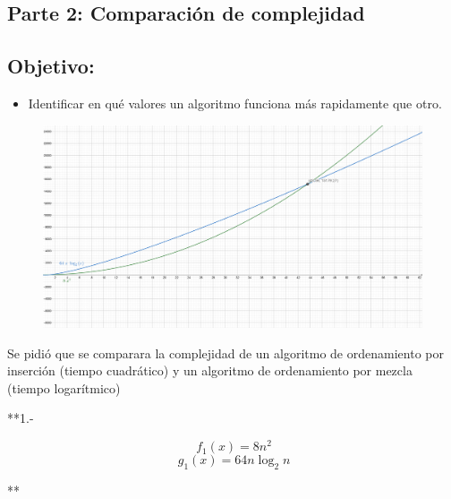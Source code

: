 \documentclass[11pt]{article}
\makeatletter
\def\maxwidth{\ifdim\Gin@nat@width>\linewidth\linewidth
    \else\Gin@nat@width\fi}
\let\Oldincludegraphics\includegraphics
\renewcommand{\includegraphics}[1]{\Oldincludegraphics[width=.8\maxwidth]{#1}}
\providecommand{\tightlist}{%
      \setlength{\itemsep}{0pt}\setlength{\parskip}{0pt}}
\makeatother
\begin{document}
    \subsection{Parte 2: Comparación de
complejidad}\label{parte-2-comparaciuxf3n-de-complejidad}

    \subsection{Objetivo:}\label{objetivo}

\begin{itemize}
\tightlist
\item
  Identificar en qué valores un algoritmo funciona más rapidamente que
  otro.
\end{itemize}

    \begin{figure}
\centering
\includegraphics{1.png}
\caption{}
\end{figure}

    Se pidió que se comparara la complejidad de un algoritmo de ordenamiento
por inserción (tiempo cuadrático) y un algoritmo de ordenamiento por
mezcla (tiempo logarítmico)

**1.-

\begin{equation}
\ f_1(x) = 8 n ^ 2
\end{equation}\begin{equation}
\ g_1(x) = 64 n\log_2 n
\end{equation}

**


    
    
    
    
\end{document}
